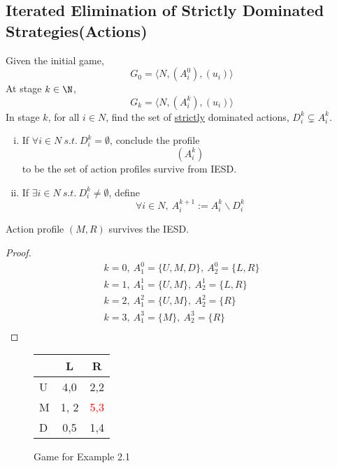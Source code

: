 \documentclass[11pt]{article}
\newcommand{\red}[1]{\textcolor{red}{#1}}
\begin{document}
		\subsection{Iterated Elimination of Strictly Dominated Strategies(Actions)}
			\begin{definition}[IESD]
				Given the initial game,
				\[
					G_0 = \langle N, (A^0_i), (u_i) \rangle
				\] 
				At stage $k \in \N$, 
				\[
					G_k = \langle N, (A^k_i), (u_i) \rangle
				\]
				In stage $k$, for all $i \in N$, find the set of \ul{strictly} dominated actions, $D_i^k \subsetneq A_i^k$.
				\begin{enumerate}[i)]
					\item If $\forall i \in N\ s.t.\ D_i^k = \emptyset$, conclude the profile
					\[
						(A_i^k)
					\]
					to be the set of action profiles survive from IESD.
					\item If $\exists i \in N\ s.t.\ D_i^k \neq \emptyset$, define
					\[
						\forall i \in N,\ A^{k+1}_i := A^k_i \backslash D_i^k
					\]
				\end{enumerate}
			\end{definition}
			
			\begin{example}
				Action profile $(M, R)$ survives the IESD.
				\begin{proof}
					\begin{gather*}
						k=0,\ A_1^0 = \{U, M, D\},\ 
						A_2^0 = \{L, R\} \\
						k=1,\ A_1^1 = \{U, M\},\ 
						A_2^1 = \{L, R\} \\
						k=2,\ A_1^2 = \{U, M\},\ 
						A_2^2 = \{R\} \\
						k=3,\ A_1^3 = \{M\},\ 
						A_2^3 = \{R\} \\
					\end{gather*}
				\end{proof}
			\end{example}
			\begin{figure*}[h]
				\centering
				\begin{tabular}{l|cc}
				  & L & R \\
				  \hline
				  U & 4,0 & 2,2 \\
				  M & 1, 2& \red{5,3} \\
				  D & 0,5 & 1,4 \\
				\end{tabular}
				\caption{Game for Example 2.1}
			\end{figure*}
			
\end{document}
